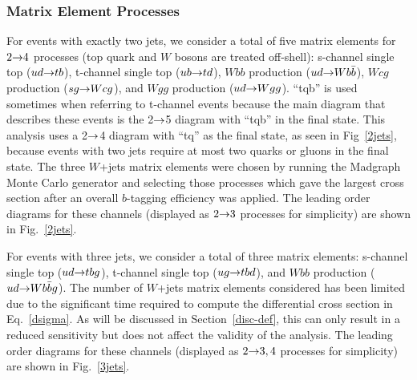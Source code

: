 \subsubsection{Matrix Element Processes}

For events with exactly two jets, we consider a total of five matrix
elements for $2{\rightarrow}4$ processes (top quark and $W$ bosons are
treated off-shell): s-channel single top ($ud{\rightarrow}tb$), t-channel
single top ($ub{\rightarrow}td$), $Wbb$ production ($ud{\rightarrow}Wb\bar{b}$),
$Wcg$ production ($sg{\rightarrow}Wcg$), and $Wgg$ production
($ud{\rightarrow}Wgg$). ``tqb'' is used sometimes when referring to t-channel
events because the main diagram that describes these events is the
2$\rightarrow$5 diagram with ``tqb'' in the final state. This analysis uses a
2$\rightarrow$4 diagram with ``tq'' as the final state, as seen in
Fig~\ref{2jets}, because events with two jets require at most two
quarks or gluons in the final state. The three $W$+jets matrix
elements were chosen by running the Madgraph Monte Carlo generator and
selecting those processes which gave the largest cross section after
an overall $b$-tagging efficiency was applied. The leading order
diagrams for these channels (displayed as $2{\rightarrow}3$ processes for
simplicity) are shown in Fig.~\ref{2jets}.

For events with three jets, we consider a total of three matrix
elements: s-channel single top ($ud{\rightarrow}tbg$), t-channel single top
($ug{\rightarrow}tbd$), and $Wbb$ production ($ud{\rightarrow}Wb\bar{b}g$). The
number of $W$+jets matrix elements considered has been limited due to
the significant time required to compute the differential cross
section in Eq.~\ref{dsigma}. As will be discussed in
Section~\ref{disc-def}, this can only result in a reduced sensitivity
but does not affect the validity of the analysis. The leading order
diagrams for these channels (displayed as $2{\rightarrow}3,4$ processes for
simplicity) are shown in Fig.~\ref{3jets}.

\clearpage

